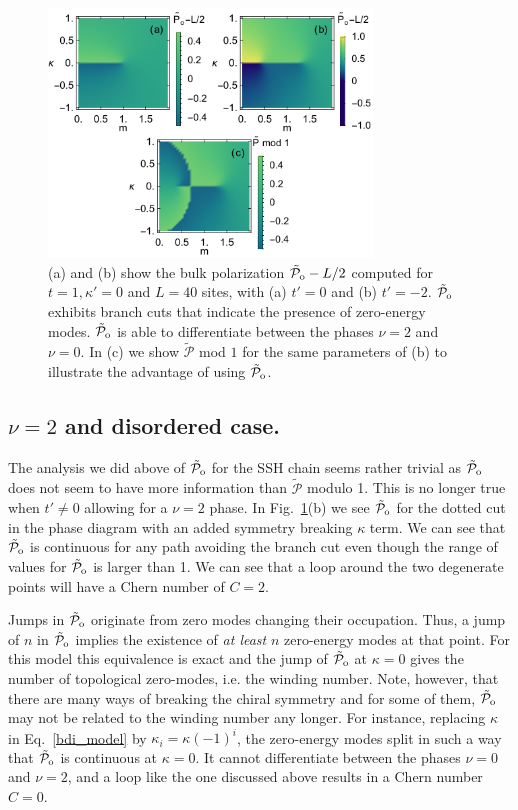 \documentclass[twocolumn,amsmath,longbibliography,amssymb,superscriptaddress]{revtex4-1}
\newcommand{\tpo}{\tilde{\mathcal{P}}_{\rm o}}
\begin{document}
\begin{figure}[t]
\includegraphics[width=86mm]{fig5comp.pdf}
\caption{(a) and (b) show the bulk polarization $\tpo-L/2$ computed for $t=1,\kappa'=0$ and $L=40$ sites, with (a) $t'=0$ and (b) $t'=-2$. $\tpo$ exhibits branch cuts that indicate the presence of zero-energy modes. $\tpo$ is able to differentiate between the phases $\nu=2$ and $\nu=0$. In (c) we show $\tilde{\mathcal{P}}$ mod $1$ for the same parameters of (b) to illustrate the advantage of using $\tpo$. }
	\label{ssh_chern}
\end{figure}




\subsection{$\nu = 2$ and disordered case. }

The analysis we did above of $\tpo$ for the SSH chain seems rather trivial as $\tpo$ does not seem to have more information than $\tilde{\mathcal{P}}$ modulo 1. This is no longer true when $t' \neq 0$ allowing for a $\nu = 2$ phase. In Fig.~\ref{ssh_chern}(b) we see $\tpo$ for the dotted cut in the phase diagram with an added symmetry breaking $\kappa$ term. We can see that $\tpo$ is continuous for any path avoiding the branch cut even though the range of values for $\tpo$ is larger than 1. We can see that a loop around the two degenerate points will have a Chern number of $C=2$. 

Jumps in $\tpo$ originate from zero modes changing their occupation. 
Thus, a jump of $n$ in $\tpo$ implies the existence of \emph{at least} $n$ zero-energy modes at that point. 
For this model this equivalence is exact and the jump of $\tpo$ at $\kappa = 0$ gives the number of topological zero-modes, i.e. the winding number. 
Note, however, that there are many ways of breaking the chiral symmetry and for some of them, $\tpo$ may not be related to the winding number any longer. 
For instance, replacing $\kappa$ in Eq.~\eqref{bdi_model} by $\kappa_i=\kappa (-1)^i$, the zero-energy modes split in such a way that $\tpo$ is continuous at $\kappa=0$. It cannot differentiate between the phases $\nu=0$ and $\nu=2$, and a loop like the one discussed above results in a Chern number $C=0$. 
\end{document}
